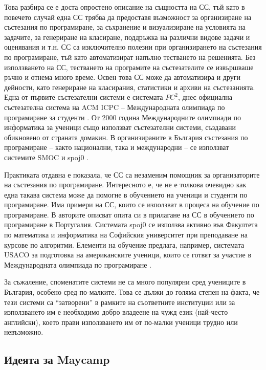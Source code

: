 \documentclass[a4paper,12pt]{article}
\begin{document}
    Това разбира се е доста опростено описание на същността на СС, тъй като в повечето случай една СС трябва да предоставя възможност за организиране на състезания по програмиране, за съхранение и визуализиране на условията на задачите, за генериране на класиране, поддръжка на различни видове задачи и оценявания и т.н. СС са изключително полезни при организирането на състезания по програмиране, тъй като автоматизират напълно тестването на решенията. Без използването на СС, тестването на програмите на състезателите се извършваше ръчно и отнема много време. Освен това СС може да автоматизира и други дейности, като генериране на класирания, статистики и архиви на състезанията. Една от първите състезателни системи е системата $PC^2$, днес официална състезателна система на ACM ICPC -- Международната олимпиада по програмиране за студенти \cite{pc2_home}. От 2000 година Международните олимпиади по информатика за ученици също използват състезателни системи, създавани обикновено от страната домакин. В организираните в България състезания по програмиране -- както национални, така и международни -- се използват системите SMOC \cite{smoc_system} и spoj0 \cite{spoj0_train}. 
 
    Практиката отдавна е показала, че СС са незаменим помощник за организаторите на състезания по програмиране. Интересното е, че не е толкова очевидно как една такава система може да помогне в обучението на ученици и студенти по програмиране. Има примери на СС, които се използват в процеса на обучение по програмиране. В \cite{intro_ribeiro} авторите описват опита си в прилагане на СС в обучението по програмиране в Португалия. Системата spoj0 се използва активно във Факултета по математика и информатика на Софийския университет при преподаване на курсове по алгоритми. Елементи на обучение предлага, например, системата USACO за подготовка на американските ученици, които се готвят за участие в Международната олимпиада по програмиране \cite{usaco_training}. 
 
    За съжаление, споменатите системи не са много популярни сред учениците в България, особено сред по-малките. Това се дължи до голяма степен на факта, че тези системи са ``затворени'' в рамките на съответните институции или за използването им е необходимо добро владеене на чужд език (най-често английски), което прави използването им от по-малки ученици трудно или невъзможно. 
    
  \subsection{Идеята за Maycamp}
  
\end{document}
